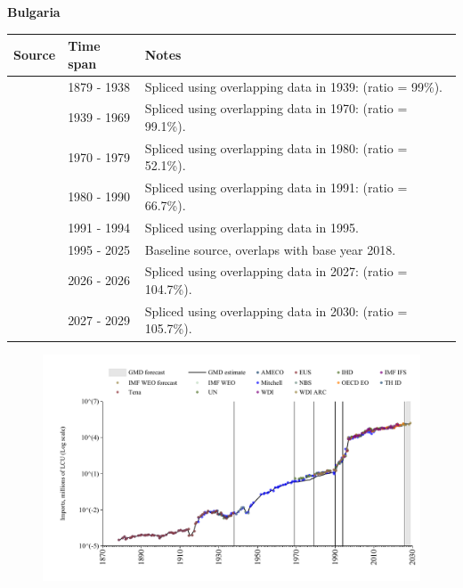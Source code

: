 \documentclass[12pt,a4paper,landscape]{article}
\begin{document}
\begin{adjustbox}{max totalsize={\paperwidth}{\paperheight},center}
\begin{minipage}[t][\textheight][t]{\textwidth}
\vspace*{0.5cm}
{}
\begin{center}
{\Large\bfseries Bulgaria}
\end{center}
\vspace{0.5cm}
\begin{table}[H]
\centering
\small
\begin{tabular}{|l|l|l|}
\hline
\textbf{Source} & \textbf{Time span} & \textbf{Notes} \\
\hline
\rowcolor{white}\cite{Tena}& 1879 - 1938 &Spliced using overlapping data in 1939: (ratio = 99\%).\\
\rowcolor{lightgray}\cite{Mitchell}& 1939 - 1969 &Spliced using overlapping data in 1970: (ratio = 99.1\%).\\
\rowcolor{white}\cite{UN}& 1970 - 1979 &Spliced using overlapping data in 1980: (ratio = 52.1\%).\\
\rowcolor{lightgray}\cite{WDI}& 1980 - 1990 &Spliced using overlapping data in 1991: (ratio = 66.7\%).\\
\rowcolor{white}\cite{AMECO}& 1991 - 1994 &Spliced using overlapping data in 1995.\\
\rowcolor{lightgray}\cite{OECD_EO}& 1995 - 2025 &Baseline source, overlaps with base year 2018.\\
\rowcolor{white}\cite{AMECO}& 2026 - 2026 &Spliced using overlapping data in 2027: (ratio = 104.7\%).\\
\rowcolor{lightgray}\cite{IMF_WEO_forecast}& 2027 - 2029 &Spliced using overlapping data in 2030: (ratio = 105.7\%).\\
\hline
\end{tabular}
\end{table}
\begin{figure}[H]
\centering
\includegraphics[width=\textwidth,height=0.6\textheight,keepaspectratio]{graphs/BGR_imports.pdf}
\end{figure}
\end{minipage}
\end{adjustbox}
\end{document}

